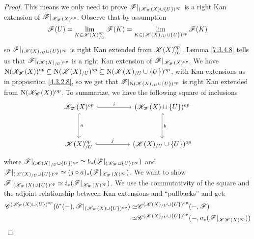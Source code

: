 \documentclass[../thesis.tex]{subfiles}
\begin{document}
\begin{proof}
    This means we only need to prove $\mathscr{F}|_{(\mathscr{K}_{\mathscr{W}}(X)\cup \{U\})^{op}}$ is a right Kan extension of $\mathscr{F}|_{\mathscr{K}_{\mathscr{W}}(X)^{op}}$.
    Observe that by assumption
    \[
        \mathscr{F}(U)  = \lim_{K\in \mathscr{K}(X)_{/U}^{op}} \mathscr{F}(K) = \lim_{K\in (\mathscr{K}(X)_{/U} \cup \{U\})^{op}} \mathscr{F}(K)
    \]
    so $\mathscr{F}|_{(\mathscr{K}(X)_{/U} \cup \{U\})^{op}}$ is right Kan extended from $\mathscr{K}(X)_{/U}^{op}$.
    Lemma \ref{7.3.4.8} tells us that $\mathscr{F}|_{(\mathscr{K}(X)_{/U})^{op}}$ is a right Kan extension of $\mathscr{F}|_{\mathscr{K}_{\mathscr{W}}(X)^{op}}$.
    We have ${\mathrm{N}(\mathscr{K}_{\mathscr{W}}(X))^{op} \subseteq\mathrm{N}(\mathscr{K}(X)_{/U})^{op} \subseteq\mathrm{N}(\mathscr{K}(X)_{/U} \cup \{U\})^{op}}$, with Kan extensions as in proposition \ref{4.3.2.8}, so we get that ${\mathscr{F}|_{\mathrm{N}(\mathscr{K}(X)_{/U} \cup \{U\})^{op}}}$ is right Kan extended from ${\mathrm{N}(\mathscr{K}_{\mathscr{W}}(X))^{op}}$.
    To summarize, we have the following square of inclusions
    \[\begin{tikzcd}
            {\K_{\W}(X)^{op}} && {(\K_{\W}(X)\cup \{U\})^{op}} \\
            \\
            {\K(X)_{/U}^{op}} && {(\K(X)_{/U} \cup \{U\})^{op}}
            \arrow["{b}", hook, from=1-3, to=3-3]
            \arrow["{j}", hook, from=3-1, to=3-3]
            \arrow["{a}", hook, from=1-1, to=3-1]
            \arrow["{i}" ,hook, from=1-1, to=1-3]
        \end{tikzcd}\]
    where $\mathscr{F}|_{(\mathscr{K}(X)_{/U} \cup \{ U \})^{op}} \simeq b_*(\mathscr{F}|_{(\mathscr{K}_{\mathscr{W}} \cup \{U\})^{op}})$ and $\mathscr{F}|_{(\mathscr{K}(X)_{/U} \cup \{U\})^{op}} \simeq (j\circ a)_*(\mathscr{F}|_{\mathscr{K}_{\mathscr{W}}(X)^{op}})$.
    We want to show $\mathscr{F}|_{(\mathscr{K}_{\mathscr{W}}(X) \cup \{U\})^{op}} \simeq i_*(\mathscr{F}|_{\mathscr{K}_{\mathscr{W}}(X)^{op}})$.
    We use the commutativity of the square and the adjoint relationship between Kan extensions and ``pullbacks'' and get:
    \begin{align}
        \C^{(\K_{\W}(X)\cup \{U\})^{op}}(b^*(\blank),\F|_{(\K_{\W}(X)\cup \{U\})^{op}})\simeq & \C^{(\K(X)_{/U} \cup \{U\})^{op}}(\blank, \F)                             \\       \simeq                                                                             & \C^{(\K(X)_{/U} \cup \{U\})^{op}}(\blank,a_*(\F|_{{\K\W}(X)^{op}})) \\

\end{align}
\end{proof}
\end{document}
